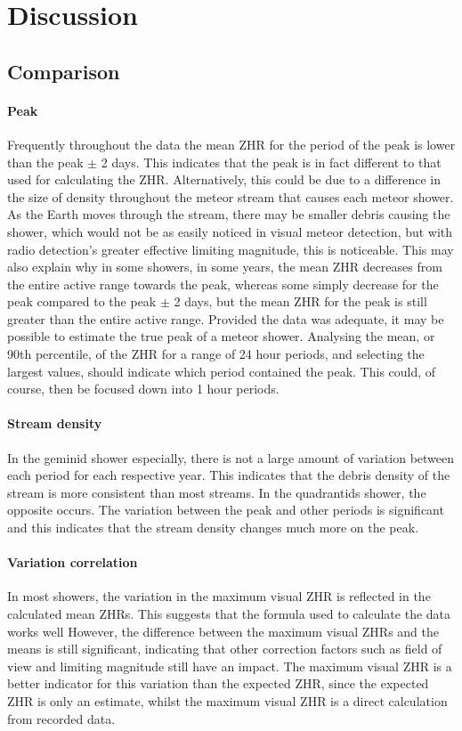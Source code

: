 \section{Discussion}
\subsection{Comparison}
\paragraph{Peak\\}
Frequently throughout the data the mean ZHR for the period of the peak is lower than the peak $\pm$ 2 days. This indicates that the peak is in fact different to that used for calculating the ZHR. Alternatively, this could be due to a difference in the size of density throughout the meteor stream that causes each meteor shower. As the Earth moves through the stream, there may be smaller debris causing the shower, which would not be as easily noticed in visual meteor detection, but with radio detection's greater effective limiting magnitude, this is noticeable. This may also explain why in some showers, in some years, the  mean ZHR decreases from the entire active range towards the peak, whereas some simply decrease for the peak compared to the peak $\pm$ 2 days, but the mean ZHR for the peak is still greater than the entire active range. Provided the data was adequate, it may be possible to estimate the true peak of a meteor shower. Analysing the mean, or 90th percentile, of the ZHR for a range of 24 hour periods, and selecting the largest values, should indicate which period contained the peak. This could, of course, then be focused down into 1 hour periods.
\paragraph{Stream density\\}
In the geminid shower especially, there is not a large amount of variation between each period for each respective year. This indicates that the debris density of the stream is more consistent than most streams. In the quadrantids shower, the opposite occurs. The variation between the peak and other periods is significant and this indicates that the stream density changes much more on the peak.
\paragraph{Variation correlation\\}
In most showers, the variation in the maximum visual ZHR is reflected in the calculated mean ZHRs. This suggests that the formula used to calculate the data works well However, the difference between the maximum visual ZHRs and the means is still significant, indicating that other correction factors such as field of view and limiting magnitude still have an impact. The maximum visual ZHR is a better indicator for this variation than the expected ZHR, since the expected ZHR is only an estimate, whilst the maximum visual ZHR is a direct calculation from recorded data. 
